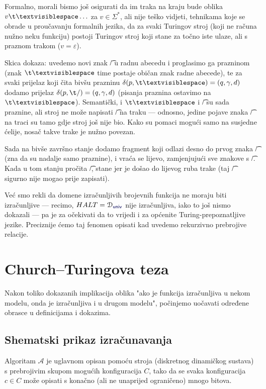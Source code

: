 \begin{napomena}\label{nap:re0}
Formalno, morali bismo još osigurati da im traka na kraju bude oblika $v\bl\ldots$ za $v\in\Sigma^*$, ali nije teško vidjeti, tehnikama koje se obrade u proučavanju formalnih jezika, da za svaki Turingov stroj (koji ne računa nužno neku funkciju) postoji Turingov stroj koji stane za točno iste ulaze, ali s praznom trakom ($v=\varepsilon$).

Skica dokaza: uvedemo novi znak \t/ u radnu abecedu i proglasimo ga prazninom (znak $\bl$ time postaje običan znak radne abecede), te za svaki prijelaz koji čita bivšu prazninu $\delta(p,\bl)=(q,\gamma,d)$ dodamo prijelaz $\delta(p,\t/)=(q,\gamma,d)$ (pisanja praznina ostavimo na $\bl$). Semantički, i $\bl$ i \t/ su sada praznine, ali stroj ne može napisati \t/ na traku --- odnosno, jedine pojave znaka \t/ na traci su tamo gdje stroj još nije bio. Kako su pomaci mogući samo na susjedne ćelije, nosač takve trake je nužno povezan.

Sada na bivše završno stanje dodamo fragment koji odlazi desno do prvog znaka \t/ (zna da su nadalje samo praznine), i vraća se lijevo, zamjenjujući sve znakove s \t/. Kada u tom stanju pročita \t/, stane jer je došao do lijevog ruba trake (taj \t/ sigurno nije mogao prije zapisati).
\end{napomena}

Već smo rekli da domene izračunljivih brojevnih funkcija ne moraju biti izračunljive --- recimo, $HALT=\dom{\f{univ}}$ nije izračunljiva, iako to još nismo dokazali --- pa je za očekivati da to vrijedi i za općenite Turing-prepoznatljive jezike. Preciznije ćemo taj fenomen opisati kad uvedemo rekurzivno prebrojive relacije.

\section{\texorpdfstring{Church--\!Turingova teza}{Church-Turingova teza}}
Nakon toliko dokazanih implikacija oblika "ako je funkcija izračunljiva u nekom modelu, onda je izračunljiva i u drugom modelu", počinjemo uočavati određene obrasce u definicijama i dokazima.

\subsection{Shematski prikaz izračunavanja}
Algoritam $\mathcal A$ je uglavnom opisan pomoću stroja (diskretnog dinamičkog sustava) s prebrojivim skupom mogućih konfiguracija $C$, tako da se svaka konfiguracija $c\in C$ može opisati s konačno (ali ne unaprijed ograničeno) mnogo bitova.


